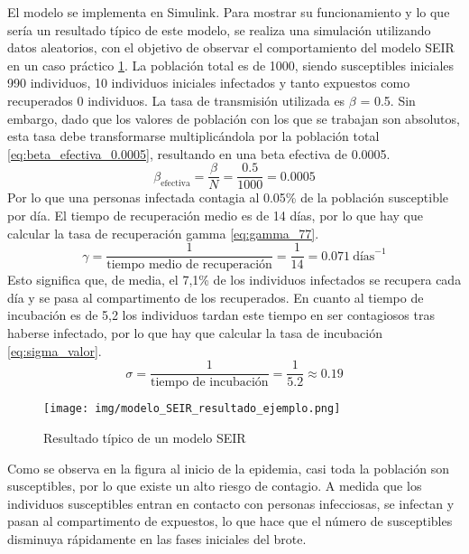 El modelo se implementa en Simulink. Para mostrar su funcionamiento y lo que sería un resultado típico de este modelo, se realiza una simulación utilizando datos aleatorios, con el objetivo de observar el comportamiento del modelo SEIR en un caso práctico \ref{fig:eje SEIR}. La población total es de 1000, siendo susceptibles iniciales 990 individuos, 10 individuos iniciales infectados y tanto expuestos como recuperados 0 individuos.
La tasa de transmisión utilizada es $\beta$ = 0.5. Sin embargo, dado que los valores de población con los que se trabajan son absolutos, esta tasa debe transformarse multiplicándola por la población total \eqref{eq:beta_efectiva_0.0005}, resultando en una beta efectiva de 0.0005.
\begin{equation}
\beta_{\text{efectiva}} = \frac{\beta}{N} = \frac{0.5}{1000} = 0.0005
\label{eq:beta_efectiva_0.0005}
\end{equation}
Por lo que una personas infectada contagia al 0.05\% de la población susceptible por día.
El tiempo de recuperación medio es de 14 días, por lo que hay que calcular la tasa de recuperación gamma \eqref{eq:gamma_77}.
\begin{equation}
\gamma = \frac{1}{\text{tiempo medio de recuperación}} = \frac{1}{14} = 0.071\ \text{días}^{-1}
\label{eq:gamma_77}
\end{equation}
Esto significa que, de media, el 7,1\% de los individuos infectados se recupera cada día y se pasa al compartimento de los recuperados.
En cuanto al tiempo de incubación es de 5,2 los individuos tardan este tiempo en ser contagiosos tras haberse infectado, por lo que hay que calcular la tasa de incubación \eqref{eq:sigma_valor}.
\begin{equation}
\sigma = \frac{1}{\text{tiempo de incubación}} = \frac{1}{5.2} \approx 0.19
\label{eq:sigma_valor}
\end{equation}

\begin{figure}[H]
    \centering
    \texttt{[image: img/modelo\_SEIR\_resultado\_ejemplo.png]}
    \caption{Resultado típico de un modelo SEIR}
    \label{fig:eje SEIR}
    \vspace{0.5cm} %
\end{figure}

Como se observa en la figura al inicio de la epidemia, casi toda la población son susceptibles, por lo que existe un alto riesgo de contagio. A medida que los individuos susceptibles entran en contacto con personas infecciosas, se infectan y pasan al compartimento de expuestos, lo que hace que el número de susceptibles disminuya rápidamente en las fases iniciales del brote.


